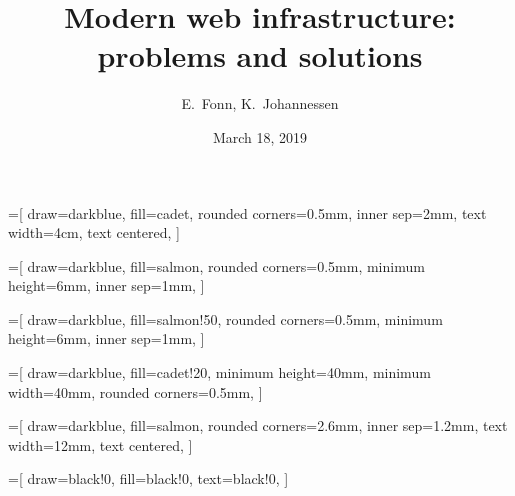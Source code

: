 \documentclass{beamer}
\begin{document}
\title[Modern web infrastructure]{
  Modern web infrastructure: problems and solutions
}

\author[E.~Fonn]{E.~Fonn, K.~Johannessen}

\date[Mar 18, 2019]{March 18, 2019}


\begin{frame}
  \titlepage
\end{frame}


=[
    draw=darkblue,
    fill=cadet,
    rounded corners=0.5mm,
    inner sep=2mm,
    text width=4cm,
    text centered,
]

=[
    draw=darkblue,
    fill=salmon,
    rounded corners=0.5mm,
    minimum height=6mm,
    inner sep=1mm,
]

=[
    draw=darkblue,
    fill=salmon!50,
    rounded corners=0.5mm,
    minimum height=6mm,
    inner sep=1mm,
]

=[
    draw=darkblue,
    fill=cadet!20,
    minimum height=40mm,
    minimum width=40mm,
    rounded corners=0.5mm,
]

=[
    draw=darkblue,
    fill=salmon,
    rounded corners=2.6mm,
    inner sep=1.2mm,
    text width=12mm,
    text centered,
]

=[
    draw=black!0,
    fill=black!0,
    text=black!0,
]
\end{document}
